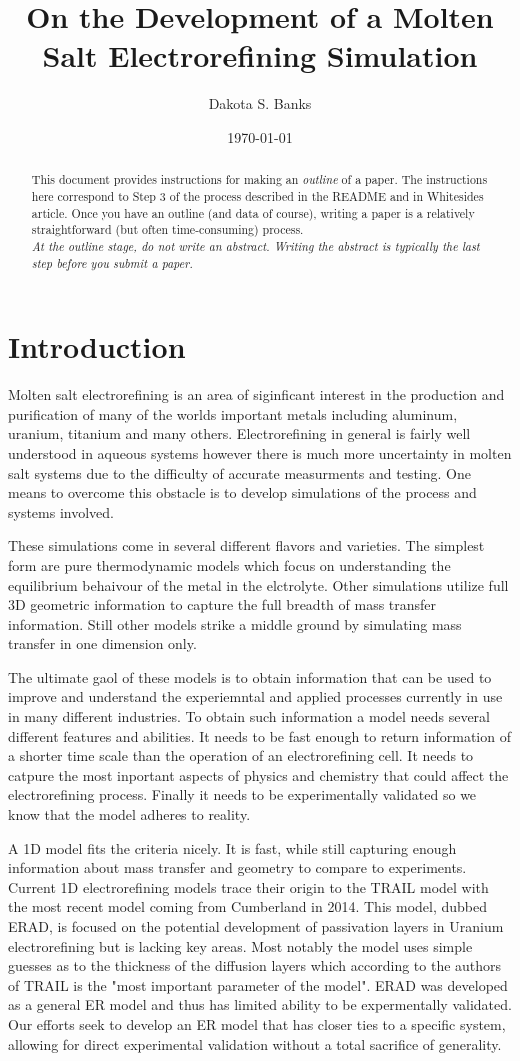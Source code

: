 \documentclass[journal=mamobx]{achemso}
\title{On the Development of a Molten Salt Electrorefining Simulation}
\author{Dakota S. Banks}
\affiliation{Chemical Engineering Department, Brigham Young University, Provo, Utah}
\date{\today}
\newcommand*{\abstracttext}{
This document provides instructions for making an \emph{outline} of a paper.
The instructions here correspond to Step $3$ of the process described in the README and in Whitesides article.
Once you have an outline (and data of course), writing a paper is a relatively straightforward (but often time-consuming) process.\\

\noindent\emph{At the outline stage, do not write an abstract.
Writing the abstract is typically the last step before you submit a paper.}
}
\let\oldmaketitle\maketitle
\let\maketitle\relax
\begin{document}
\oldmaketitle
\begin{abstract}
  \abstracttext
\end{abstract}

\section{Introduction}
Molten salt electrorefining is an area of siginficant interest in the production and purification of many of the worlds important metals including aluminum, uranium, titanium and many others. 
Electrorefining in general is fairly well understood in aqueous systems however there is much more uncertainty in molten salt systems due to the difficulty of accurate measurments and testing. 
One means to overcome this obstacle is to develop simulations of the process and systems involved.

These simulations come in several different flavors and varieties.
The simplest form are pure thermodynamic models which focus on understanding the equilibrium behaivour of the metal in the elctrolyte. 
Other simulations utilize full 3D geometric information to capture the full breadth of mass transfer information.
Still other models strike a middle ground by simulating mass transfer in one dimension only. 

The ultimate gaol of these models is to obtain information that can be used to improve and understand the experiemntal and applied processes currently in use in many different industries. 
To obtain such information a model needs several different features and abilities. It needs to be fast enough to return information of a shorter time scale than the operation of an electrorefining cell.
It needs to catpure the most inportant aspects of physics and chemistry that could affect the electrorefining process.
Finally it needs to be experimentally validated so we know that the model adheres to reality.

A 1D model fits the criteria nicely. It is fast, while still capturing enough information about mass transfer and geometry to compare to experiments. 
Current 1D electrorefining models trace their origin to the TRAIL model with the most recent model coming from Cumberland in 2014. 
This model, dubbed ERAD, is focused on the potential development of passivation layers in Uranium electrorefining but is lacking key areas.
Most notably the model uses simple guesses as to the thickness of the diffusion layers which according to the authors of TRAIL is the "most important parameter of the model". 
ERAD was developed as a general ER model and thus has limited ability to be expermentally validated. 
Our efforts seek to develop an ER model that has closer ties to a specific system, allowing for direct experimental validation without a total sacrifice of generality.
\end{document}
